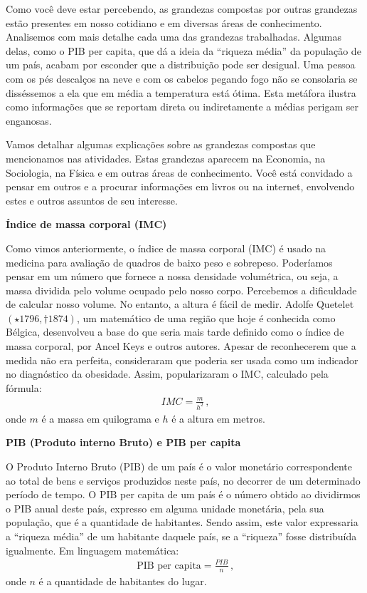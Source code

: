 \label{\detokenize{NO103-2:organizando-ideias-grandezas-compostas}}
Como você deve estar percebendo, as grandezas compostas por outras grandezas estão presentes em nosso cotidiano e em diversas áreas de conhecimento. Analisemos com mais detalhe cada uma das grandezas trabalhadas. Algumas delas, como o PIB per capita, que dá a ideia da “riqueza média” da população de um país, acabam por esconder que a distribuição pode ser desigual. Uma pessoa com os pés descalços na neve e com os cabelos pegando fogo não se consolaria se disséssemos a ela que em média a temperatura está ótima. Esta metáfora ilustra como informações que se reportam direta ou indiretamente a médias perigam ser enganosas.

Vamos detalhar algumas explicações sobre as grandezas compostas que mencionamos nas atividades. Estas grandezas aparecem na Economia, na Sociologia, na Física e em outras áreas de conhecimento. Você está convidado a pensar em outros e a procurar informações em livros ou na internet, envolvendo estes e outros assuntos de seu interesse.

\textbf{Índice de massa corporal (IMC)}

Como vimos anteriormente, o índice de massa corporal (IMC)  é usado na medicina para avaliação de quadros de baixo peso e sobrepeso.  Poderíamos pensar em um número que fornece a nossa densidade volumétrica, ou seja, a massa dividida pelo volume ocupado pelo nosso corpo. Percebemos a dificuldade de calcular nosso volume. No entanto, a altura é fácil de medir. Adolfe Quetelet $(\star 1796, \dagger 1874)$, um matemático de uma região que hoje é conhecida como Bélgica, desenvolveu a base do que seria mais tarde definido como o índice de massa corporal, por  Ancel Keys e outros autores. Apesar de reconhecerem que a medida não era perfeita, consideraram que poderia ser usada como um indicador no diagnóstico da obesidade. Assim, popularizaram o IMC, calculado pela fórmula:
\begin{equation*}
\begin{split}IMC=\frac{m}{h^2}\, \text{,}\end{split}
\end{equation*}
onde $m$ é a massa em quilograma e $h$ é a altura em metros.

\textbf{PIB (Produto interno Bruto) e PIB per capita}

O Produto Interno Bruto (PIB) de um país é o valor monetário correspondente ao total de bens e serviços produzidos neste país, no decorrer de um determinado período de tempo. O PIB per capita de um país é o número obtido ao dividirmos o PIB anual deste país, expresso em alguma unidade monetária, pela sua população, que é a quantidade de habitantes. Sendo assim, este valor expressaria a “riqueza média” de um habitante daquele país, se a “riqueza” fosse distribuída igualmente. Em linguagem matemática:
\begin{equation*}
\begin{split}\text{PIB per capita} = \frac{PIB}{n} \, \text{,}\end{split}
\end{equation*}
onde $n$ é a quantidade de habitantes do lugar.

